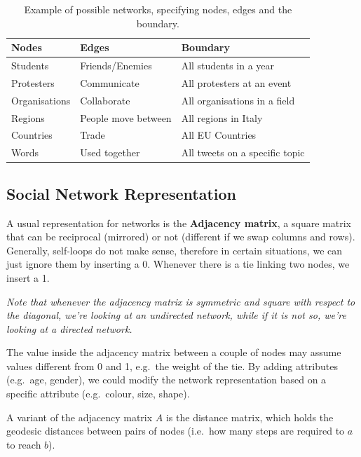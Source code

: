 \documentclass[
  notitlepage,
  onecolumn,
  openany]{book}
\begin{document}
\begin{table}[h!]
\centering
\begin{tabular}{@{}lll@{}}
\toprule
\textbf{Nodes} & \textbf{Edges}      & \textbf{Boundary}              \\ \midrule
Students       & Friends/Enemies     & All students in a year         \\
Protesters     & Communicate         & All protesters at an event     \\
Organisations  & Collaborate         & All organisations in a field   \\
Regions        & People move between & All regions in Italy           \\
Countries      & Trade               & All EU Countries               \\
Words          & Used together       & All tweets on a specific topic \\ \bottomrule
\end{tabular}
\caption{Example of possible networks, specifying nodes, edges and the boundary. }
\label{tab:network_example}
\end{table}

\hypertarget{social-network-representation}{%
\subsection{Social Network Representation}\label{social-network-representation}}

A usual representation for networks is the \textbf{Adjacency matrix}, a square matrix that can be reciprocal (mirrored) or not (different if we swap columns and rows). Generally, self-loops do not make sense, therefore in certain situations, we can just ignore them by inserting a 0. Whenever there is a tie linking two nodes, we insert a 1.

\emph{Note that whenever the adjacency matrix is symmetric and square with respect to the diagonal, we're looking at an undirected network, while if it is not so, we're looking at a directed network.}

The value inside the adjacency matrix between a couple of nodes may assume values different from 0 and 1, e.g.~the weight of the tie. By adding attributes (e.g.~age, gender), we could modify the network representation based on a specific attribute (e.g.~colour, size, shape).

A variant of the adjacency matrix \(A\) is the distance matrix, which holds the geodesic distances between pairs of nodes (i.e.~how many steps are required to \(a\) to reach \(b\)).
\end{document}
